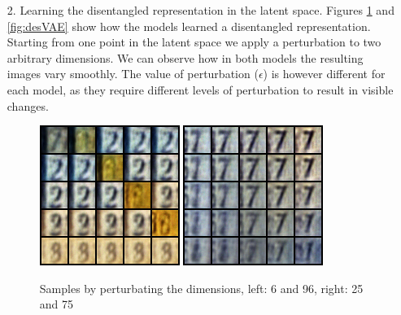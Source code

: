 \begin{itemize}
\begin{enumerate}
\item[2.]{Learning the disentangled representation in the latent space.}
Figures \ref{fig:des1} and \ref{fig:desVAE} show how the models learned a disentangled representation. Starting from one point in the latent space we apply a perturbation to two arbitrary dimensions. We can observe how in both models the resulting images vary smoothly. The value of perturbation ($\epsilon$) is however different for each model, as they require different levels of perturbation to result in visible changes.
\begin{figure}[H]
	\centering
	\includegraphics[scale=1]{gandesent1.png}
	\quad
	\includegraphics[scale=1]{gandesent2.png}
	\caption{Samples by perturbating the dimensions, left: 6 and 96, right: 25 and 75}
	\label{fig:des1}
\end{figure}



\end{enumerate}
\end{itemize}
